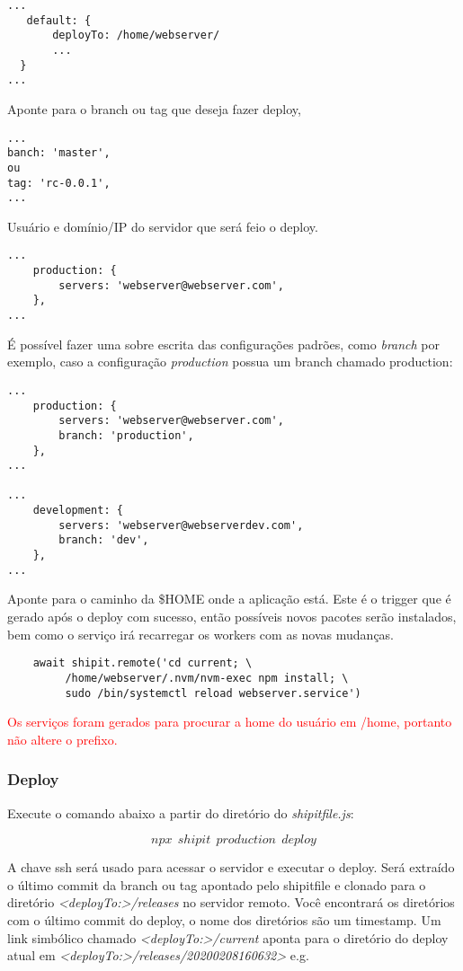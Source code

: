 \color{black}
\begin{verbatim}
...
   default: {
       deployTo: /home/webserver/
       ...
  }
...
\end{verbatim}

Aponte para o branch ou tag que deseja fazer deploy,
\begin{verbatim}
...
banch: 'master',
ou
tag: 'rc-0.0.1',
...
\end{verbatim}

Usuário e domínio/IP do servidor que será feio o deploy.
\begin{verbatim}
...
    production: {
        servers: 'webserver@webserver.com',
    },
...
\end{verbatim}

É possível fazer uma sobre escrita das configurações padrões,
como \emph{branch} por exemplo, caso a configuração \emph{production}
possua um branch chamado production:
\begin{verbatim}
...
    production: {
        servers: 'webserver@webserver.com',
        branch: 'production',
    },
...

...
    development: {
        servers: 'webserver@webserverdev.com',
        branch: 'dev',
    },
...
\end{verbatim}

Aponte para o caminho da \$HOME onde a aplicação está. Este é o
trigger que é gerado após o deploy com sucesso, então possíveis novos
pacotes serão instalados, bem como o serviço irá recarregar os workers
com as novas mudanças.

\begin{verbatim}
    await shipit.remote('cd current; \
         /home/webserver/.nvm/nvm-exec npm install; \
         sudo /bin/systemctl reload webserver.service')
\end{verbatim}

\textcolor{red}{Os serviços foram gerados para procurar a home do
  usuário em /home, portanto não altere o prefixo.}

\subsubsection{Deploy}
Execute o comando abaixo a partir do diretório do
\emph{shipitfile.js}:

$$npx\ \ shipit\ \ production\ \ deploy$$

A chave ssh será usado para acessar o servidor e executar o
deploy. Será extraído o último commit da branch ou tag apontado pelo
shipitfile e clonado para o diretório
\textit{<\textit{deployTo:}>/releases} no servidor remoto. Você
encontrará os diretórios com o último commit do deploy, o nome dos
diretórios são um timestamp. Um link simbólico chamado
\textit{<deployTo:>/current} aponta para o diretório do deploy atual
em \textit{<deployTo:>/releases/20200208160632>} e.g. 


